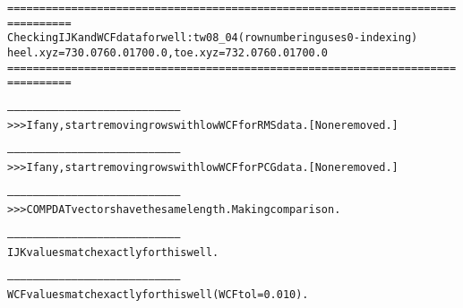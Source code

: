 \begin{alltt}
================================================================================
Checking IJK and WCF data for well: tw08_04 (row numbering uses 0-indexing)
heel.xyz = 730.0 760.0 1700.0, toe.xyz = 732.0 760.0 1700.0
================================================================================

--------------------------------------------------------------------------------
>>> If any, start removing rows with low WCF for RMS data. [None removed.]

--------------------------------------------------------------------------------
>>> If any, start removing rows with low WCF for PCG data. [None removed.]

--------------------------------------------------------------------------------
>>> COMPDAT vectors have the same length. Making comparison.

--------------------------------------------------------------------------------
IJK values match exactly for this well.

--------------------------------------------------------------------------------
WCF values match exactly for this well (WCF tol = 0.010).
\end{alltt}
